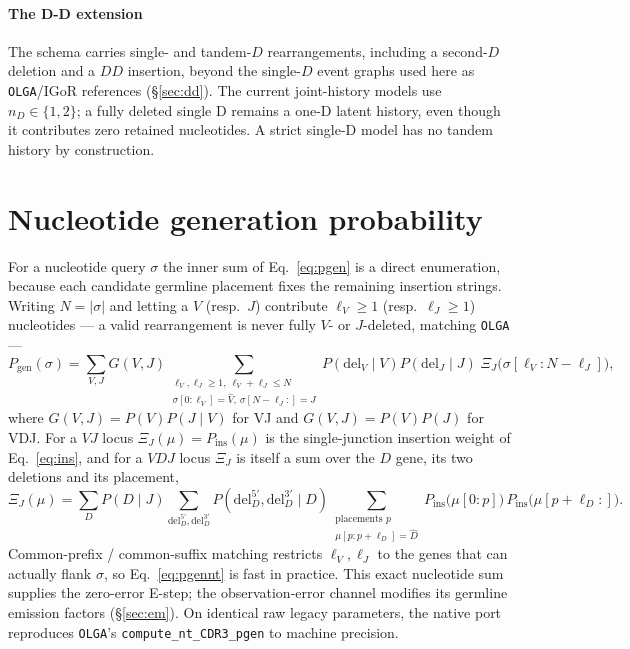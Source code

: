 \documentclass[11pt]{article}
\theoremstyle{oldplain}
\theoremstyle{oldrem}
\newcommand{\Pgen}{P_{\mathrm{gen}}}
\newcommand{\ins}{\mathrm{ins}}
\newcommand{\del}{\mathrm{del}}
\begin{document}
\paragraph{The D-D extension} The schema carries single- and tandem-$D$
rearrangements, including a second-$D$ deletion and a $DD$ insertion, beyond the
single-$D$ event graphs used here as \texttt{OLGA}/IGoR references
(\S\ref{sec:dd}). The current joint-history models use $n_D\in\{1,2\}$; a fully deleted
single D remains a one-D latent history, even though it contributes zero retained
nucleotides. A strict single-D model has no tandem history by construction.

\section{Nucleotide generation probability}\label{sec:nt}

For a nucleotide query $\sigma$ the inner sum of Eq.~\eqref{eq:pgen} is a direct enumeration, because each candidate germline placement fixes the remaining insertion strings. Writing $N=|\sigma|$ and letting a $V$
(resp.\ $J$) contribute $\ell_V\ge1$ (resp.\ $\ell_J\ge1$) nucleotides --- a valid rearrangement is never
fully $V$- or $J$-deleted, matching \texttt{OLGA} ---
\begin{equation}\label{eq:pgennt}
  \Pgen(\sigma)=\!\!\sum_{V,J}\! G(V,J)\!\!
    \sum_{\substack{\ell_V,\ell_J\ge 1,\ \ell_V+\ell_J\le N\\ \sigma[0{:}\ell_V]=\hat V,\ \sigma[N-\ell_J{:}]=\hat J}}
    \!\! P(\del_V\mid V)P(\del_J\mid J)\;\Xi_J\bigl(\sigma[\ell_V{:}N-\ell_J]\bigr),
\end{equation}
where $G(V,J)=P(V)P(J\mid V)$ for VJ and $G(V,J)=P(V)P(J)$ for VDJ.
For a $VJ$ locus $\Xi_J(\mu)=P_{\ins}(\mu)$ is the single-junction insertion weight of
Eq.~\eqref{eq:ins}, and for a $VDJ$ locus $\Xi_J$ is itself a sum over the $D$ gene, its two deletions and
its placement,
\begin{equation}\label{eq:dmiddle}
  \Xi_J(\mu)=\sum_D P(D\!\mid\! J)\!\!\sum_{\del_D^{5'},\del_D^{3'}}\!\! P(\del_D^{5'},\del_D^{3'}\mid D)
    \sum_{\substack{\text{placements }p\\ \mu[p{:}p+\ell_D]=\hat D}}\!\!
    P_{\ins}\bigl(\mu[0{:}p]\bigr)\,P_{\ins}\bigl(\mu[p+\ell_D{:}]\bigr).
\end{equation}
Common-prefix / common-suffix matching restricts $\ell_V,\ell_J$ to the genes that can actually flank
$\sigma$, so Eq.~\eqref{eq:pgennt} is fast in practice. This exact nucleotide sum supplies the zero-error E-step; the observation-error
channel modifies its germline emission factors (\S\ref{sec:em}). On identical raw legacy parameters, the native port reproduces \texttt{OLGA}'s \texttt{compute\_nt\_CDR3\_pgen} to
machine precision.
\end{document}
